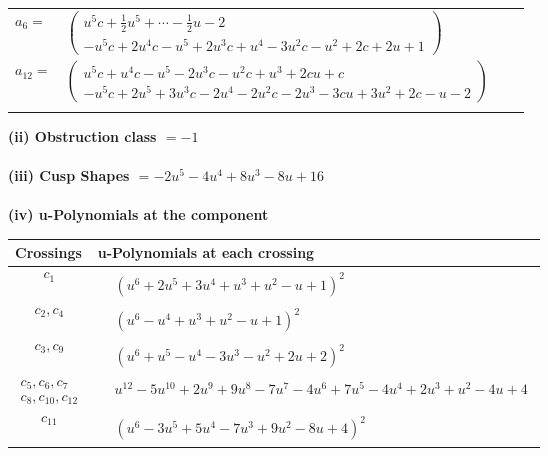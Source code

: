 \documentclass[1p]{elsarticle_modified}
\theoremstyle{definition}
\begin{document}
\begin{tabular}{m{7pt} m{180pt} m{7pt} m{180pt} }
\flushright $a_{6}=$&$\begin{pmatrix}u^5 c+\frac{1}{2} u^5+\cdots-\frac{1}{2} u-2\\- u^5 c+2 u^4 c- u^5+2 u^3 c+u^4-3 u^2 c- u^2+2 c+2 u+1\end{pmatrix}$ \\
\flushright $a_{12}=$&$\begin{pmatrix}u^5 c+u^4 c- u^5-2 u^3 c- u^2 c+u^3+2 c u+c\\- u^5 c+2 u^5+3 u^3 c-2 u^4-2 u^2 c-2 u^3-3 c u+3 u^2+2 c- u-2\end{pmatrix}$\\&\end{tabular}
\flushleft \textbf{(ii) Obstruction class $= -1$}\\~\\
\flushleft \textbf{(iii) Cusp Shapes $= -2 u^5-4 u^4+8 u^3-8 u+16$}\\~\\
\newpage\renewcommand{\arraystretch}{1}
\flushleft \textbf{(iv) u-Polynomials at the component}\newline \\
\begin{tabular}{m{50pt}|m{274pt}}
Crossings & \hspace{64pt}u-Polynomials at each crossing \\
\hline $$\begin{aligned}c_{1}\end{aligned}$$&$\begin{aligned}
&(u^6+2 u^5+3 u^4+u^3+u^2- u+1)^2
\end{aligned}$\\
\hline $$\begin{aligned}c_{2},c_{4}\end{aligned}$$&$\begin{aligned}
&(u^6- u^4+u^3+u^2- u+1)^2
\end{aligned}$\\
\hline $$\begin{aligned}c_{3},c_{9}\end{aligned}$$&$\begin{aligned}
&(u^6+u^5- u^4-3 u^3- u^2+2 u+2)^2
\end{aligned}$\\
\hline $$\begin{aligned}c_{5},c_{6},c_{7}\\c_{8},c_{10},c_{12}\end{aligned}$$&$\begin{aligned}
&u^{12}-5 u^{10}+2 u^9+9 u^8-7 u^7-4 u^6+7 u^5-4 u^4+2 u^3+u^2-4 u+4
\end{aligned}$\\
\hline $$\begin{aligned}c_{11}\end{aligned}$$&$\begin{aligned}
&(u^6-3 u^5+5 u^4-7 u^3+9 u^2-8 u+4)^2
\end{aligned}$\\
\hline
\end{tabular}\\~\\
\end{document}
